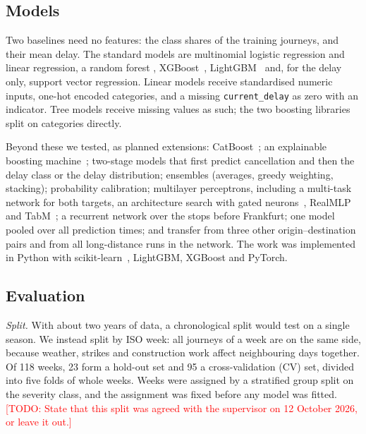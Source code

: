 \documentclass[conference]{IEEEtran}
\newcommand{\todo}[1]{\textcolor{red}{[TODO: #1]}}
\newcommand{\cdelay}{\texttt{current\_delay}}
\begin{document}
\subsection{Models}

Two baselines need no features: the class shares of the training journeys, and their mean delay.
The standard models are multinomial logistic regression and linear regression, a random forest
\cite{breiman2001forests}, XGBoost~\cite{chen2016xgboost}, LightGBM~\cite{ke2017lightgbm} and, for
the delay only, support vector regression. Linear models receive standardised numeric inputs,
one-hot encoded categories, and a missing \cdelay{} as zero with an indicator. Tree models receive
missing values as such; the two boosting libraries split on categories directly.

Beyond these we tested, as planned extensions: CatBoost~\cite{prokhorenkova2018catboost}; an
explainable boosting machine~\cite{nori2019interpretml}; two-stage models that first predict
cancellation and then the delay class or the delay distribution; ensembles (averages, greedy
weighting, stacking); probability calibration; multilayer perceptrons, including a multi-task
network for both targets, an architecture search with gated neurons~\cite{orucu2026tabgns},
RealMLP~\cite{holzmuller2024realmlp} and TabM~\cite{gorishniy2025tabm}; a recurrent network over the
stops before Frankfurt; one model pooled over all prediction times; and transfer from three other
origin--destination pairs and from all long-distance runs in the network. The work was implemented
in Python with scikit-learn~\cite{pedregosa2011sklearn}, LightGBM, XGBoost and PyTorch.

\subsection{Evaluation}
\label{sec:evaluation}

\emph{Split.} With about two years of data, a chronological split would test on a single season. We
instead split by ISO week: all journeys of a week are on the same side, because weather, strikes and
construction work affect neighbouring days together. Of 118 weeks, 23 form a hold-out set and 95 a
cross-validation (CV) set, divided into five folds of whole weeks. Weeks were assigned by a
stratified group split on the severity class, and the assignment was fixed before any model was
fitted. \todo{State that this split was agreed with the supervisor on 12 October 2026, or leave it
out.}
\end{document}
